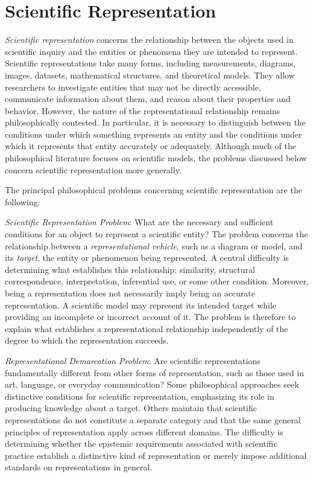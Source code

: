 %
%

\section{Scientific Representation}
\label{sec:scientific_representation}

\emph{Scientific representation} concerns the relationship between the objects used in scientific inquiry and the entities or phenomena they are intended to represent. Scientific representations take many forms, including measurements, diagrams, images, datasets, mathematical structures, and theoretical models. They allow researchers to investigate entities that may not be directly accessible, communicate information about them, and reason about their properties and behavior. However, the nature of the representational relationship remains philosophically contested. In particular, it is necessary to distinguish between the conditions under which something represents an entity and the conditions under which it represents that entity accurately or adequately. Although much of the philosophical literature focuses on scientific models, the problems discussed below concern scientific representation more generally.

The principal philosophical problems concerning scientific representation are the following:

\emph{Scientific Representation Problem}: What are the necessary and sufficient conditions for an object to represent a scientific entity? The problem concerns the relationship between a \emph{representational vehicle}, such as a diagram or model, and its \emph{target}, the entity or phenomenon being represented. A central difficulty is determining what establishes this relationship: similarity, structural correspondence, interpretation, inferential use, or some other condition. Moreover, being a representation does not necessarily imply being an accurate representation. A scientific model may represent its intended target while providing an incomplete or incorrect account of it. The problem is therefore to explain what establishes a representational relationship independently of the degree to which the representation succeeds.

\emph{Representational Demarcation Problem}: Are scientific representations fundamentally different from other forms of representation, such as those used in art, language, or everyday communication? Some philosophical approaches seek distinctive conditions for scientific representation, emphasizing its role in producing knowledge about a target. Others maintain that scientific representations do not constitute a separate category and that the same general principles of representation apply across different domains. The difficulty is determining whether the epistemic requirements associated with scientific practice establish a distinctive kind of representation or merely impose additional standards on representations in general.

